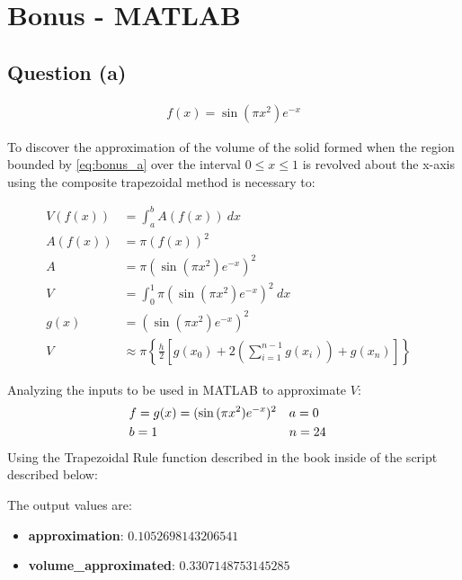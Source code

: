 \section{Bonus - MATLAB}
	\subsection{Question (a)}
		\begin{align}
			f(x) = \sin{(\pi x^{2})}e^{-x} \label{eq:bonus_a}
		\end{align}

		To discover the approximation of the volume of the solid formed when the region bounded by \cref{eq:bonus_a} over the interval $0 \leq x \leq 1$ is revolved about the x-axis using the composite trapezoidal method is necessary to:

		\begin{align}
			V(f(x)) &= \int_{a}^{b} A(f(x)) \ dx& \\
			A(f(x)) &= \pi (f(x))^{2}& \\
			A &= \pi (\sin{(\pi x^{2})}e^{-x})^{2}& \\
			V &= \int_{0}^{1} \pi (\sin{(\pi x^{2})}e^{-x})^{2} \ dx& \\
			g(x) &= (\sin{(\pi x^{2})}e^{-x})^{2}& \\
			V &\approx \pi \left\{ \frac{h}{2}\left[g(x_{0})+2\left(\sum_{i=1}^{n-1}g(x_i)\right)+g(x_{n})\right] \right\}&
		\end{align}

		Analyzing the inputs to be used in MATLAB to approximate $V$:
		\begin{align}
			&f = g(x) = (\sin{(\pi x^{2})}e^{-x})^{2}& &a = 0& \notag \\
			&b = 1& &n = 24& \notag
		\end{align}
		Using the Trapezoidal Rule function described in the book  inside of the script described below:
		\\
		\noindent\makebox[\linewidth]{\rule{\paperwidth/2}{0.4pt}}
		
		\noindent\makebox[\linewidth]{\rule{\paperwidth/2}{0.4pt}}

		The output values are:
		\begin{itemize}
			\item{\textbf{approximation}: $0.1052698143206541$}
			\item{\textbf{volume\_approximated}: $0.3307148753145285$}
		\end{itemize}

